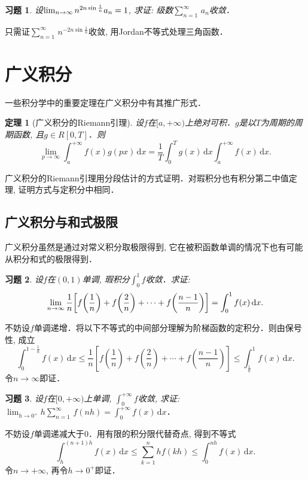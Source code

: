 \documentclass[11pt,a4paper]{ctexart}
\makeatletter
\theoremstyle{thmseries} %
\newtheorem{thm}{定理}[section]
\theoremstyle{exerseries}
\newtheorem{exer}{习题}[section]
\renewenvironment{proof}[1][\proofname]{\par
  \pushQED{\qed}%
  \normalfont \topsep6\p@\@plus6\p@\relax
  \trivlist
  \item[\hskip\labelsep
        \itshape
    #1\@addpunct{}]\ignorespaces
}{%
  \popQED\endtrivlist\@endpefalse
}
\newenvironment{pf}{\begin{proof}[\bfseries\upshape 证\quad]}{\end{proof}}
\newcommand{\bra}[1]{\mathopen{}\left(#1\right)}
\newcommand{\sbra}[1]{\mathopen{}\left[#1\right]}
\renewcommand{\d}{\mathrm{d}}
\def \nti {\mathnormal{n}\to\infty}
\def \tseries {{\textstyle\sum\limits_{n=1}^{\infty}}\,} %
\def \dseries {\sum_{n=1}^{\infty}\,} %
\makeatother
\begin{document}
\begin{exer}
	设$\lim_{\nti}n^{2n\sin\frac{1}{n}}a_n=1$, 求证: 级数$\tseries a_n$收敛．
\end{exer}
\begin{pf}
	只需证$\tseries n^{-2n\sin\frac{1}{n}}$收敛, 用Jordan不等式处理三角函数．
\end{pf}


\section{广义积分}
一些积分学中的重要定理在广义积分中有其推广形式．
\begin{thm}[广义积分的Riemann引理]
	设$f$在$[a,+\infty)$上绝对可积．$g$是以$T$为周期的周期函数, 且$g\in R[0,T]$．则
	\[\lim_{p\to\infty}\int_{a}^{+\infty}f(x)g(px)\,\d x=\frac{1}{T}\int_{0}^{T}g(x)\,\d x\int_{a}^{+\infty}f(x)\,\d x.\]
\end{thm}

广义积分的Riemann引理用分段估计的方式证明．对瑕积分也有积分第二中值定理, 证明方式与定积分中相同．


\subsection{广义积分与和式极限}
广义积分虽然是通过对常义积分取极限得到, 它在被积函数单调的情况下也有可能从积分和式的极限得到．
\begin{exer}
	设$f$在$(0,1)$单调, 瑕积分$\int_{0}^{1}f$收敛．求证:
	\[\lim_{\nti}\frac{1}{n}\sbra{f\bra{\frac{1}{n}}+f\bra{\frac{2}{n}}+\cdots+f\bra{\frac{n-1}{n}}}=\int_{0}^{1}f(x)\,\d x.\]
\end{exer}
\begin{pf}
	不妨设$f$单调递增．将以下不等式的中间部分理解为阶梯函数的定积分．则由保号性, 成立
	\[\int_{0}^{1-\frac{1}{n}}f(x)\,\d x\leq\frac{1}{n}\sbra{f\bra{\frac{1}{n}}+f\bra{\frac{2}{n}}+\cdots+f\bra{\frac{n-1}{n}}}\leq\int_{\frac{1}{n}}^{1}f(x)\,\d x.\]
	令$n\to\infty$即证．
\end{pf}

\begin{exer}
	设$f$在$[0,+\infty)$上单调, $\int_{0}^{+\infty}f$收敛, 求证: $\lim_{h\to0^+}h\dseries f(nh)=\int_{0}^{+\infty}f(x)\,\d x$．
\end{exer}
\begin{pf}
	不妨设$f$单调递减大于$0$．用有限的积分限代替奇点, 得到不等式
	\[\int_{h}^{(n+1)h}f(x)\,\d x\leq\sum_{k=1}^{n}hf(kh)\leq\int_{0}^{nh}f(x)\,\d x.\]
	令$n\to+\infty$, 再令$h\to0^+$即证．
\end{pf}
\end{document}
